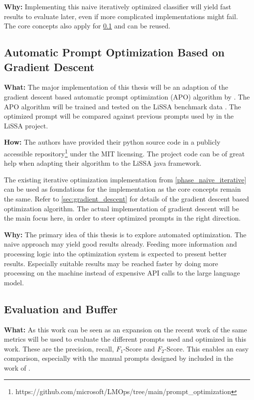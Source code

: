 \textbf{Why:} Implementing this naive iteratively optimized classifier will yield fast results to evaluate later, even if more complicated implementations might fail. The core concepts also apply for \ref{phase_gradient_descent} and can be reused. 


\subsection{Automatic Prompt Optimization Based on Gradient Descent}
\label{phase_gradient_descent}
\textbf{What:} The major implementation of this thesis will be an adaption of the gradient descent based automatic prompt optimization (APO) algorithm by . 
The APO algorithm will be trained and tested on the LiSSA benchmark data \cite{fuchss2022ArDoCoBenchmark}. The optimized prompt will be compared against previous prompts used by \citeauthor{fuchss2025LiSSAGeneric} in the LiSSA project.

\textbf{How:} The authors have provided their python source code in a publicly accessible repository\footnote{https://github.com/microsoft/LMOps/tree/main/prompt\_optimization} under the MIT licensing. The project code can be of great help when adapting their algorithm to the LiSSA java framework.

The existing iterative optimization implementation from \ref{phase_naive_iterative} can be used as foundations for the implementation as the core concepts remain the same. Refer to \ref{sec:gradient_descent} for details of the gradient descent based optimization algorithm. The actual implementation of gradient descent will be the main focus here, in order to steer optimized prompts in the right direction.


\textbf{Why:} The primary idea of this thesis is to explore automated optimization. The naive approach may yield good results already. Feeding more information and processing logic into the optimization system is expected to present better results. Especially suitable results may be reached faster by doing more processing on the machine instead of expensive API calls to the large language model.


\subsection{Evaluation and Buffer}
\label{phase_evaluation}
\textbf{What:} As this work can be seen as an expansion on the recent work of  the same metrics will be used to evaluate the different prompts used and optimized in this work. These are the precision, recall, $F_1$-Score and $F_2$-Score. This enables an easy comparison, especially with the manual prompts designed by  included in the work of \citeauthor{fuchss2025LiSSAGeneric}.

